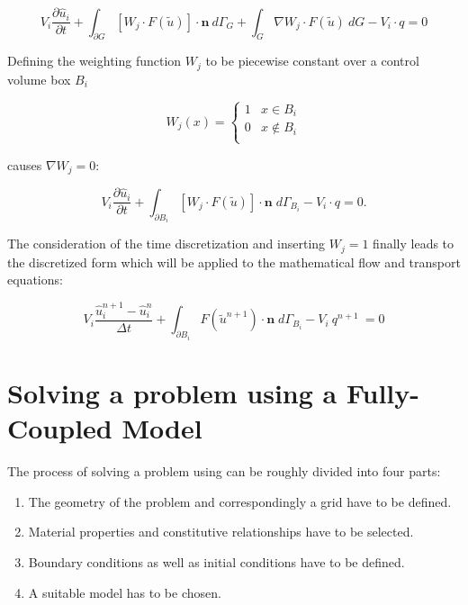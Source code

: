 \begin{equation}
	V_i \frac{\partial \hat u_i}{\partial t} + \int_{\partial G}  \left[ W_j \cdot F(\tilde u)\right]  \cdot \mathbf n \: d\varGamma_G + \int_G  \nabla W_j \cdot F(\tilde u)  \: dG- V_i \cdot q = 0
\end{equation}

Defining the weighting function $W_j$ to be piecewise constant over a control volume box $B_i$ 

\begin{equation}
	W_j(x) = \begin{cases}
	          1 &x \in B_i \\
		  0 &x \notin B_i\\
	         \end{cases}
\end{equation}

causes $\nabla W_j = 0$:

\begin{equation}
\label{eq:disc1} 
	V_i \frac{\partial \hat u_i}{\partial t} + \int_{\partial B_i}  \left[ W_j \cdot F(\tilde u)\right] \cdot \mathbf n  \;  d{\varGamma}_{B_i} - V_i \cdot q = 0 .
\end{equation}

The consideration of the time discretization and inserting $W_j = 1$ finally leads to the discretized form which will be applied to the mathematical flow and transport equations:

\begin{equation}
\label{eq:discfin} 
	V_i \frac{\hat u_i^{n+1} - \hat u_i^{n}}{\Delta t} + \int_{\partial B_i}  F(\tilde u^{n+1}) \cdot \mathbf n  \;  d{\varGamma}_{B_i} - V_i \: q^{n+1} \: = 0 
\end{equation}

\section[Fully-coupled model]{Solving a problem using a Fully-Coupled Model}\label{tutorial-coupled}

The process of solving a problem using \Dumux can be roughly divided into four parts:
\begin{enumerate}
 \item The geometry of the problem and correspondingly a grid have to be defined.
 \item Material properties and constitutive relationships have to be selected.
 \item Boundary conditions as well as initial conditions have to be defined.
 \item A suitable model has to be chosen.
\end{enumerate}

